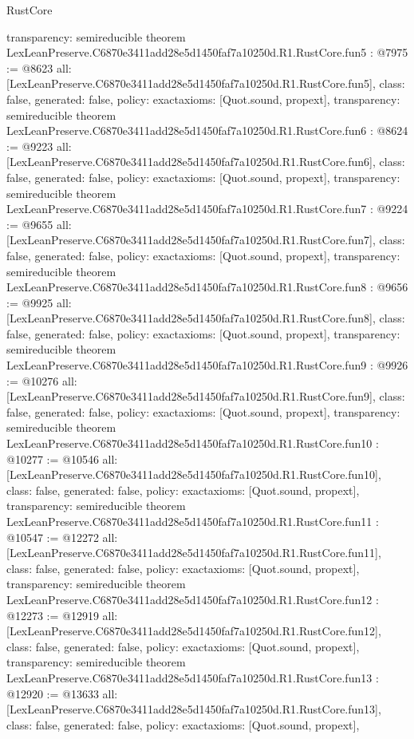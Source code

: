 \begin{lexlean}{RustCore}
\begin{coremodule}
{  transparency: semireducible
}
theorem LexLeanPreserve.C6870e3411add28e5d1450faf7a10250d.R1.RustCore.fun5 : @7975 := @8623 {
  all: [LexLeanPreserve.C6870e3411add28e5d1450faf7a10250d.R1.RustCore.fun5],
  class: false,
  generated: false,
  policy: exact{axioms: [Quot.sound, propext]},
  transparency: semireducible
}
theorem LexLeanPreserve.C6870e3411add28e5d1450faf7a10250d.R1.RustCore.fun6 : @8624 := @9223 {
  all: [LexLeanPreserve.C6870e3411add28e5d1450faf7a10250d.R1.RustCore.fun6],
  class: false,
  generated: false,
  policy: exact{axioms: [Quot.sound, propext]},
  transparency: semireducible
}
theorem LexLeanPreserve.C6870e3411add28e5d1450faf7a10250d.R1.RustCore.fun7 : @9224 := @9655 {
  all: [LexLeanPreserve.C6870e3411add28e5d1450faf7a10250d.R1.RustCore.fun7],
  class: false,
  generated: false,
  policy: exact{axioms: [Quot.sound, propext]},
  transparency: semireducible
}
theorem LexLeanPreserve.C6870e3411add28e5d1450faf7a10250d.R1.RustCore.fun8 : @9656 := @9925 {
  all: [LexLeanPreserve.C6870e3411add28e5d1450faf7a10250d.R1.RustCore.fun8],
  class: false,
  generated: false,
  policy: exact{axioms: [Quot.sound, propext]},
  transparency: semireducible
}
theorem LexLeanPreserve.C6870e3411add28e5d1450faf7a10250d.R1.RustCore.fun9 : @9926 := @10276 {
  all: [LexLeanPreserve.C6870e3411add28e5d1450faf7a10250d.R1.RustCore.fun9],
  class: false,
  generated: false,
  policy: exact{axioms: [Quot.sound, propext]},
  transparency: semireducible
}
theorem LexLeanPreserve.C6870e3411add28e5d1450faf7a10250d.R1.RustCore.fun10 : @10277 := @10546 {
  all: [LexLeanPreserve.C6870e3411add28e5d1450faf7a10250d.R1.RustCore.fun10],
  class: false,
  generated: false,
  policy: exact{axioms: [Quot.sound, propext]},
  transparency: semireducible
}
theorem LexLeanPreserve.C6870e3411add28e5d1450faf7a10250d.R1.RustCore.fun11 : @10547 := @12272 {
  all: [LexLeanPreserve.C6870e3411add28e5d1450faf7a10250d.R1.RustCore.fun11],
  class: false,
  generated: false,
  policy: exact{axioms: [Quot.sound, propext]},
  transparency: semireducible
}
theorem LexLeanPreserve.C6870e3411add28e5d1450faf7a10250d.R1.RustCore.fun12 : @12273 := @12919 {
  all: [LexLeanPreserve.C6870e3411add28e5d1450faf7a10250d.R1.RustCore.fun12],
  class: false,
  generated: false,
  policy: exact{axioms: [Quot.sound, propext]},
  transparency: semireducible
}
theorem LexLeanPreserve.C6870e3411add28e5d1450faf7a10250d.R1.RustCore.fun13 : @12920 := @13633 {
  all: [LexLeanPreserve.C6870e3411add28e5d1450faf7a10250d.R1.RustCore.fun13],
  class: false,
  generated: false,
  policy: exact{axioms: [Quot.sound, propext]},
}
\end{coremodule}
\end{lexlean}

